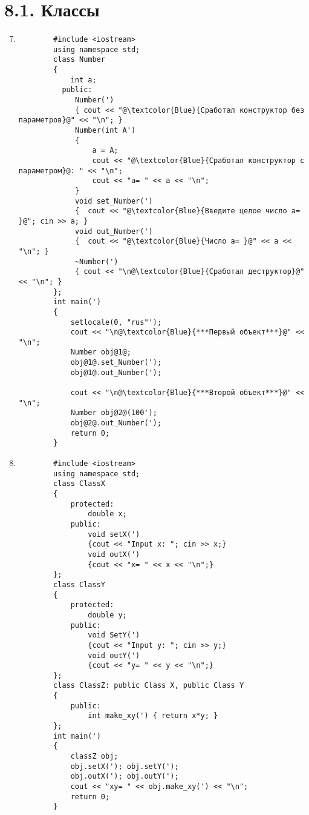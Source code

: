 \section*{8.1. Классы}
\begin{enumerate}[leftmargin=*]
    \setcounter{enumi}{6}
    \item \begin{lstlisting}
        #include <iostream>
        using namespace std;
        class Number
        {
            int a;
          public:
             Number(')
             { cout << "@\textcolor{Blue}{Сработал конструктор без параметров}@" << "\n"; }
             Number(int A')
             {
                 a = A;
                 cout << "@\textcolor{Blue}{Сработал конструктор с параметром}@: " << "\n";
                 cout << "a= " << a << "\n";
             }
             void set_Number(')
             {  cout << "@\textcolor{Blue}{Введите целое число a= }@"; cin >> a; }
             void out_Number(')
             {  cout << "@\textcolor{Blue}{Число a= }@" << a << "\n"; }
             ~Number(')
             { cout << "\n@\textcolor{Blue}{Сработал деструктор}@" << "\n"; }
        };
        int main(')
        {
            setlocale(0, "rus"');
            cout << "\n@\textcolor{Blue}{***Первый объект***}@" << "\n";
            Number obj@1@;
            obj@1@.set_Number(');
            obj@1@.out_Number(');

            cout << "\n@\textcolor{Blue}{***Второй объект***}@" << "\n";
            Number obj@2@(100');
            obj@2@.out_Number(');
            return 0;
        }
    \end{lstlisting}
    \setcounter{enumi}{15}
    \item \mbox{} \begin{lstlisting}
        #include <iostream>
        using namespace std;
        class ClassX
        {
            protected:
                double x;
            public:
                void setX(')
                {cout << "Input x: "; cin >> x;}
                void outX(')
                {cout << "x= " << x << "\n";}
        };
        class ClassY
        {
            protected:
                double y;
            public:
                void SetY(')
                {cout << "Input y: "; cin >> y;}
                void outY(')
                {cout << "y= " << y << "\n";}
        };
        class ClassZ: public Class X, public Class Y
        {
            public:
                int make_xy(') { return x*y; }
        };
        int main(')
        {
            classZ obj;
            obj.setX('); obj.setY(');
            obj.outX('); obj.outY(');
            cout << "xy= " << obj.make_xy(') << "\n";
            return 0;
        }
    \end{lstlisting}
\end{enumerate}

